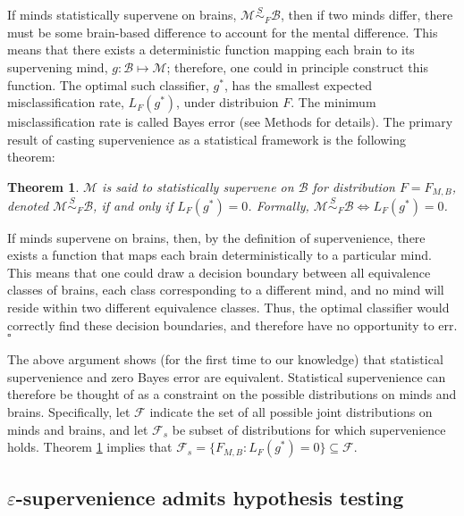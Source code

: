 \documentclass{article}
\newcommand{\mB}{\mathcal{B}}
\newcommand{\mM}{\mathcal{M}}
\newcommand{\eps}{\varepsilon}
\providecommand{\mc}[1]{\mathcal{#1}}
\newcommand{\MsB}{\mM \overset{S}{\sim}_{F} \mB}
\newtheorem{thm}{Theorem}
\begin{document}
If minds statistically supervene on brains, $\MsB$, then if two minds differ, there must be some brain-based difference to account for the mental difference.  This means that there exists a deterministic function mapping each brain to its supervening mind, $g: \mB \mapsto \mM$; therefore, one could in principle construct this function. The optimal such classifier, $g^*$, has the smallest expected misclassification rate, $L_{F}(g^*)$, under distribuion $F$.  The minimum misclassification rate is called Bayes error (see Methods for details). 
The primary result of casting supervenience as a statistical framework is the following theorem: 
\begin{thm}
\label{thm1} 
$\mM$ is said to \textit{statistically supervene} on $\mB$ for distribution $F=F_{M,B}$, denoted $\mM \overset{S}{\sim}_{F} \mB$, if and only if $L_{F}(g^*) = 0$. Formally, \mbox{$\MsB \Leftrightarrow L_{F}(g^*)=0$}.  
\end{thm}
\noindent If minds supervene on brains, then, by the definition of supervenience, there exists a function that maps each brain deterministically to a particular mind.  This means that one could draw a decision boundary between all equivalence classes of brains, each class corresponding to a different mind, and no mind will reside within two different equivalence classes.  Thus, the optimal classifier would correctly find these decision boundaries, and therefore have no opportunity to err. $\square$

The above argument shows (for the first time to our knowledge) that statistical supervenience and zero Bayes error are equivalent. Statistical supervenience can therefore be thought of as a constraint on the possible distributions on minds and brains.  Specifically, let $\mc{F}$ indicate the set of all possible joint distributions on minds and brains, and let $\mc{F}_s$ be subset of distributions for which supervenience holds. Theorem \ref{thm1} implies that $\mc{F}_s = \{F_{M,B} : L_{F}(g^*)=0\} \subseteq \mc{F}$.


\subsection*{$\eps$-supervenience admits hypothesis testing} %
\label{sub:hypothesis_testing}
\end{document}
